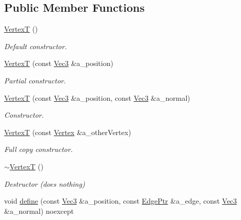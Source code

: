 \subsection*{Public Member Functions}
\begin{DoxyCompactItemize}
\item 
\hyperlink{classDcel_1_1VertexT_ab93f0a7a59fa9d78d89d1b0e97451ce7}{VertexT} ()
\begin{DoxyCompactList}\small\item\em Default constructor. \end{DoxyCompactList}\item 
\hyperlink{classDcel_1_1VertexT_ade01d01c6a145c31c6f46dccc902cfae}{VertexT} (const \hyperlink{classDcel_1_1VertexT_a6e073dc7426756edef5594816be6e7c7}{Vec3} \&a\+\_\+position)
\begin{DoxyCompactList}\small\item\em Partial constructor. \end{DoxyCompactList}\item 
\hyperlink{classDcel_1_1VertexT_a90d3c97e605b8084667a85ddfb4ba8bc}{VertexT} (const \hyperlink{classDcel_1_1VertexT_a6e073dc7426756edef5594816be6e7c7}{Vec3} \&a\+\_\+position, const \hyperlink{classDcel_1_1VertexT_a6e073dc7426756edef5594816be6e7c7}{Vec3} \&a\+\_\+normal)
\begin{DoxyCompactList}\small\item\em Constructor. \end{DoxyCompactList}\item 
\hyperlink{classDcel_1_1VertexT_ac904e9902633915706d81122e72aa847}{VertexT} (const \hyperlink{classDcel_1_1VertexT_a2c8a221a9f03e9bafa891bd0759b4f8f}{Vertex} \&a\+\_\+other\+Vertex)
\begin{DoxyCompactList}\small\item\em Full copy constructor. \end{DoxyCompactList}\item 
\mbox{\label{classDcel_1_1VertexT_ab0a8e0aa0960f68177e115b897283a1c}} 
\hyperlink{classDcel_1_1VertexT_ab0a8e0aa0960f68177e115b897283a1c}{$\sim$\+VertexT} ()
\begin{DoxyCompactList}\small\item\em Destructor (does nothing) \end{DoxyCompactList}\item 
void \hyperlink{classDcel_1_1VertexT_a20a894d436707a4205501bbc5cd72323}{define} (const \hyperlink{classDcel_1_1VertexT_a6e073dc7426756edef5594816be6e7c7}{Vec3} \&a\+\_\+position, const \hyperlink{classDcel_1_1VertexT_a7c049a24ac43b9750578e4f4ed543831}{Edge\+Ptr} \&a\+\_\+edge, const \hyperlink{classDcel_1_1VertexT_a6e073dc7426756edef5594816be6e7c7}{Vec3} \&a\+\_\+normal) noexcept

\end{DoxyCompactItemize}
